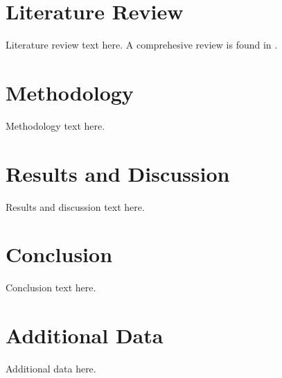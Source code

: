 \documentclass{thesis-dissertation}
\begin{document}
\chapter{Literature Review}
Literature review text here. A comprehesive review is found in \cite{smith2022sample}. 

\chapter{Methodology}
Methodology text here.

\lipsum[7-8]

\chapter{Results and Discussion}
Results and discussion text here.

\lipsum[9-10]

\chapter{Conclusion}
Conclusion text here.

\lipsum[11-12]

\nocite{*}
\printbibliography

\appendix
\chapter{Additional Data}
Additional data here.
\end{document}
